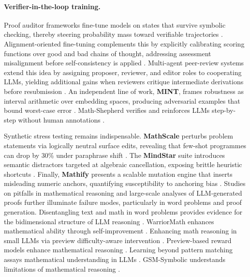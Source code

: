 \documentclass[acmsmall,anonymous]{acmart}
\begin{document}
\paragraph{Verifier-in-the-loop training.}
Proof auditor frameworks fine-tune models on states that survive symbolic checking, thereby steering probability mass toward verifiable trajectories \cite{wang2024mumath}.  Alignment-oriented fine-tuning complements this by explicitly calibrating scoring functions over good and bad chains of thought, addressing assessment misalignment before self-consistency is applied \cite{wang-2023-alignment-reasoning}.  Multi-agent peer-review systems extend this idea by assigning proposer, reviewer, and editor roles to cooperating LLMs, yielding additional gains when reviewers critique intermediate derivations before resubmission \cite{xu-2023-peer-review}.  An independent line of work, \textbf{MINT}, frames robustness as interval arithmetic over embedding spaces, producing adversarial examples that bound worst-case error \cite{li2024mint}. Math-Shepherd verifies and reinforces LLMs step-by-step without human annotations \cite{wang2024c}.

Synthetic stress testing remains indispensable.  \textbf{MathScale} perturbs problem statements via logically neutral surface edits, revealing that few-shot programmes can drop by 30\% under paraphrase shift \cite{tang2024mathscale}.  The \textbf{MindStar} suite introduces semantic distractors targeted at algebraic cancellation, exposing brittle heuristic shortcuts \cite{li2024mindstar}.  Finally, \textbf{Mathify} presents a scalable mutation engine that inserts misleading numeric anchors, quantifying susceptibility to anchoring bias \cite{imani2024mathify,imani2024mathprompter}. Studies on pitfalls in mathematical reasoning \cite{anonymous2025canllmmath,anonymous2025wordsense,anonymous2025canllmmath,anonymous2025wordsense} and large-scale analyses of LLM-generated proofs \cite{anonymous2025largescaleproofs,anonymous2025largescaleproofs} further illuminate failure modes, particularly in word problems and proof generation. Disentangling text and math in word problems provides evidence for the bidimensional structure of LLM reasoning \cite{calais-etal-2025-disentangling}. WarriorMath enhances mathematical ability through self-improvement \cite{anonymous2025warriormath}. Enhancing math reasoning in small LLMs via preview difficulty-aware intervention \cite{anonymous2025enhancingmathsmall}. Preview-based reward models enhance mathematical reasoning \cite{anonymous2025enhancingmathreasoningllm}. Learning beyond pattern matching assays mathematical understanding in LLMs \cite{guo2024a}. GSM-Symbolic understands limitations of mathematical reasoning \cite{mirzadeh2024}.
\end{document}
